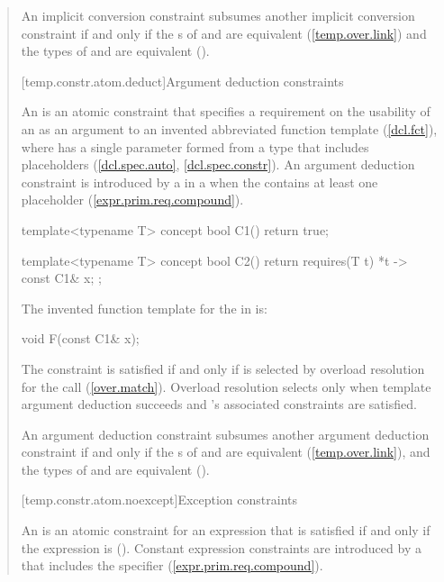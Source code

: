 \begin{quote}
\pnum
An implicit conversion constraint  subsumes another implicit 
conversion constraint  if and only if the s 
of  and  are equivalent (\ref{temp.over.link}) and the types
of  and  are equivalent ().


[temp.constr.atom.deduct]{Argument deduction constraints}

\pnum
An  is an atomic
constraint that specifies a requirement on 
the usability of an  
 as an argument to an invented abbreviated
function template  (\ref{dcl.fct}),
where  has a single parameter formed from a type that 
includes placeholders 
(\ref{dcl.spec.auto}, \ref{dcl.spec.constr}).
% 
\enternote
An argument deduction constraint is introduced by a
 in a
 when the
contains at least one placeholder
(\ref{expr.prim.req.compound}).
\exitnote
% 
\enterexample
\begin{codeblock}
template<typename T>
concept bool C1() { return true; }

template<typename T>
concept bool C2() { return requires(T t) { {*t} -> const C1& x; }; }
\end{codeblock}
The invented function template for the
 in
 is:
\begin{codeblock}
void F(const C1& x);
\end{codeblock}
\exitexample
% 
The constraint is satisfied if and only if 
is selected by overload resolution for the call 
(\ref{over.match}).
% 
\enternote
Overload resolution selects  only when template 
argument deduction succeeds and 's associated 
constraints are satisfied.
\exitnote

\pnum
An argument deduction constraint  subsumes another argument deduction 
constraint  if and only if the s of
 and  are equivalent (\ref{temp.over.link}), and the types
of  and  are equivalent (). 


[temp.constr.atom.noexcept]{Exception constraints}

\pnum
An  is an atomic constraint
for an expression  that is satisfied if and only
if the expression  is 
().
% 
\enternote
Constant expression constraints are introduced by a
 that
includes the  specifier
(\ref{expr.prim.req.compound}).
\exitnote



\end{quote}
